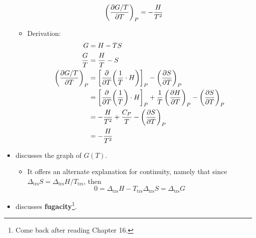 \documentclass[../notes.tex]{subfiles}
\begin{document}
\begin{itemize}
\begin{equation*}
        \left( \pdv{G/T}{T} \right)_P = -\frac{H}{T^2}
    \end{equation*}
    \begin{itemize}
        \item Derivation:
        \begin{align*}
            G &= H-TS\\
            \frac{G}{T} &= \frac{H}{T}-S\\
            \left( \pdv{G/T}{T} \right)_P &= \left[ \pdv{T}(\frac{1}{T}\cdot H) \right]_P-\left( \pdv{S}{T} \right)_P\\
            &= \left[ \pdv{T}(\frac{1}{T})\cdot H \right]_P+\frac{1}{T}\left( \pdv{H}{T} \right)_P-\left( \pdv{S}{T} \right)_P\\
            &= -\frac{H}{T^2}+\frac{C_P}{T}-\left( \pdv{S}{T} \right)_P\\
            &= -\frac{H}{T^2}
        \end{align*}
    \end{itemize}
    \item \textcite{bib:McQuarrieSimon} discusses the graph of $G(T)$.
    \begin{itemize}
        \item It offers an alternate explanation for continuity, namely that since $\Delta_\text{trs}S=\Delta_\text{trs}H/T_\text{trs}$, then
        \begin{equation*}
            0 = \Delta_\text{trs}H-T_\text{trs}\Delta_\text{trs}S = \Delta_\text{trs}G
        \end{equation*}
    \end{itemize}
    \item \textcite{bib:McQuarrieSimon} discusses \textbf{fugacity}\footnote{Come back after reading Chapter 16.}.
\end{itemize}
\end{document}
